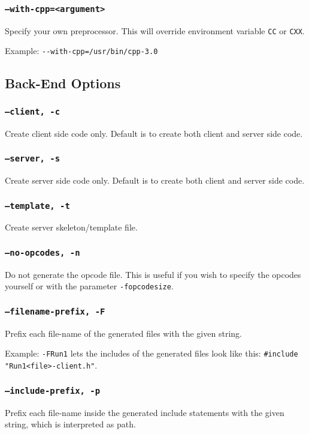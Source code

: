 \subsubsection{{\tt --with-cpp=<argument>}}
Specify your own preprocessor. This will override environment
variable \verb|CC| or \verb|CXX|.

Example: \verb|--with-cpp=/usr/bin/cpp-3.0|

\subsection{Back-End Options}

\subsubsection{{\tt --client, -c}}
Create client side code only. Default is to create both client and server side code.

\subsubsection{{\tt --server, -s}}
Create server side code only. Default is to create both client and server side code.

\subsubsection{{\tt --template, -t}}
Create server skeleton/template file.

\subsubsection{{\tt --no-opcodes, -n}}
Do not generate the opcode file. This is useful if you wish to specify the opcodes
yourself or with the parameter {\tt -fopcodesize}.

\subsubsection{{\tt --filename-prefix, -F}}
Prefix each file-name of the \dice{} generated files with the given
string.

Example: \verb|-FRun1| lets the includes of the generated files
look like this: \verb|#include "Run1<file>-client.h"|.

\subsubsection{{\tt --include-prefix, -p}}
Prefix each file-name inside the generated include statements
with the given string, which is interpreted as path.

